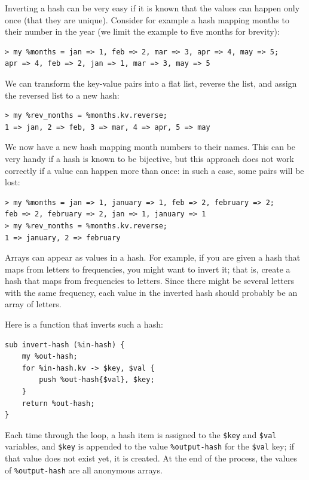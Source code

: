 Inverting a hash can be very easy if it is known that the 
values can happen only once (that they are unique). Consider 
for example a hash mapping months to their number in the year 
(we limit the example to five months for brevity):

\begin{verbatim}
> my %months = jan => 1, feb => 2, mar => 3, apr => 4, may => 5;
apr => 4, feb => 2, jan => 1, mar => 3, may => 5
\end{verbatim}
%

We can transform the key-value pairs into a flat list, 
reverse the list, and assign the reversed list to a new 
hash:

\begin{verbatim}
> my %rev_months = %months.kv.reverse;
1 => jan, 2 => feb, 3 => mar, 4 => apr, 5 => may
\end{verbatim}
%

We now have a new hash mapping month numbers to their names.
This can be very handy if a hash is known to be bijective, but this approach does not work correctly if a value can 
happen more than once: in such a case, some pairs will be 
lost:

\begin{verbatim}
> my %months = jan => 1, january => 1, feb => 2, february => 2;
feb => 2, february => 2, jan => 1, january => 1
> my %rev_months = %months.kv.reverse;
1 => january, 2 => february
\end{verbatim}

Arrays can appear as values in a hash.  For example, if you
are given a hash that maps from letters to frequencies, you
might want to invert it; that is, create a hash that maps
from frequencies to letters.  Since there might be several 
letters with the same frequency, each value in the inverted hash 
should probably be an array of letters.

Here is a function that inverts such a hash:

\begin{verbatim}
sub invert-hash (%in-hash) { 
    my %out-hash; 
    for %in-hash.kv -> $key, $val {
        push %out-hash{$val}, $key; 
    }
    return %out-hash;
}
\end{verbatim}
%
Each time through the loop, a hash item is assigned to the  \verb'$key' and \verb'$val' variables, and \verb'$key' is 
appended to the value \verb'%output-hash' for the \verb'$val' 
key; if that value does not exist yet, it is created. At 
the end of the process, the values of \verb'%output-hash' are 
all anonymous arrays.

